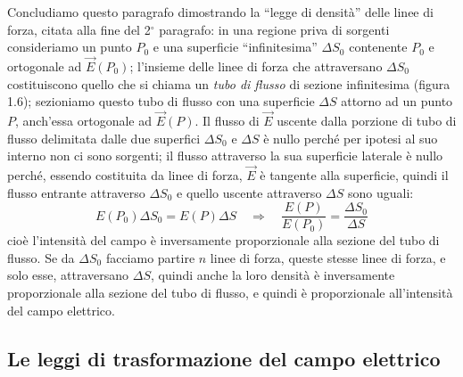 Concludiamo questo paragrafo dimostrando la ``legge di densit\`a'' delle linee
di forza, citata alla fine del 2$^\circ$ paragrafo: in una regione priva di
sorgenti consideriamo un punto $P_0$ e una superficie ``infinitesima''
$\Delta S_0$ contenente $P_0$ e ortogonale ad $\vec E(P_0)$; l'insieme delle
linee di forza che attraversano $\Delta S_0$ costituiscono quello che si chiama
un \emph{tubo di flusso} di sezione infinitesima (figura 1.6); sezioniamo questo
tubo di flusso con una superficie $\Delta S$ attorno ad un punto $P$, anch'essa
ortogonale ad $\vec E(P)$. Il flusso di $\vec E$ uscente dalla porzione di tubo
di flusso delimitata dalle due superfici $\Delta S_0$ e $\Delta S$ \`e nullo
perch\'e per ipotesi al suo interno non ci sono sorgenti; il flusso attraverso
la sua superficie laterale \`e nullo perch\'e, essendo costituita da linee di
forza, $\vec E$ \`e tangente alla superficie, quindi il flusso entrante
attraverso $\Delta S_0$ e quello uscente attraverso $\Delta S$ sono uguali:
\begin{equation}
  E(P_0)\Delta S_0=E(P)\Delta S\quad\Rightarrow\quad\frac{E(P)}{E(P_0)}
  =\frac{\Delta S_0}{\Delta S}
  \tag{1.36}
\end{equation}
cio\`e l'intensit\`a del campo \`e inversamente proporzionale alla sezione del
tubo di flusso. Se da $\Delta S_0$ facciamo partire $n$ linee di forza, queste
stesse linee di forza, e solo esse, attraversano $\Delta S$, quindi anche la
loro densit\`a \`e inversamente proporzionale alla sezione del tubo di flusso, e
quindi \`e proporzionale all'intensit\`a del campo elettrico.

\subsection{Le leggi di trasformazione del campo elettrico}

